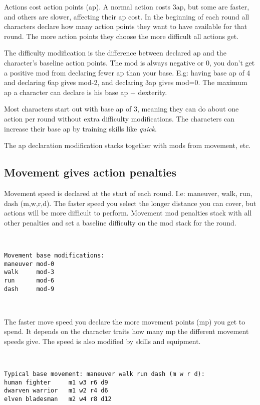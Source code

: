 Actions cost action points (ap). A normal action costs 3ap, but some are faster, and others are slower, affecting their ap cost. In the beginning of each round all characters declare how many action points they want to have available for that round. The more action points they choose the more difficult all actions get.

The difficulty modification is the difference between declared ap and the character's baseline action points. The mod is always negative or 0, you don't get a positive mod from declaring fewer ap than your base. E.g: having base ap of 4 and declaring 6ap gives mod-2, and declaring 3ap gives mod=0. The maximum ap a character can declare is his base ap + dexterity.

Most characters start out with base ap of 3, meaning they can do about one action per round without extra difficulty modifications. The characters can increase their base ap by training skills like \emph{quick}.

The ap declaration modification stacks together with mods from movement, etc.


\subsection*{Movement gives action penalties}
Movement speed is declared at the start of each round. I.e: maneuver, walk, run, dash (m,w,r,d). The faster speed you select the longer distance you can cover, but actions will be more difficult to perform. Movement mod penalties stack with all other penalties and set a baseline difficulty on the mod stack for the round.

\

\small \begin{verbatim}
Movement base modifications:
maneuver mod-0
walk     mod-3
run      mod-6
dash     mod-9
\end{verbatim} \normalsize

\

The faster move speed you declare the more movement points (mp) you get to spend. It depends on the character traits how many mp the different movement speeds give. The speed is also modified by skills and equipment.

\

\small \begin{verbatim}
Typical base movement: maneuver walk run dash (m w r d):
human fighter     m1 w3 r6 d9
dwarven warrior   m1 w2 r4 d6
elven bladesman   m2 w4 r8 d12
\end{verbatim} \normalsize

